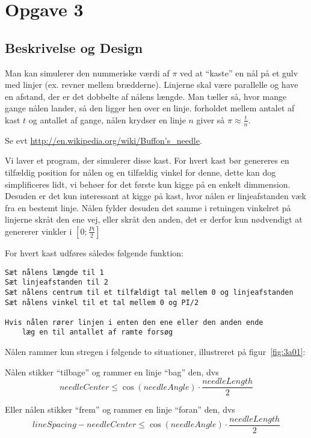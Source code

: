 \section{Opgave 3}
\subsection{Beskrivelse og Design}
	
	Man kan simulerer den nummeriske værdi af $\pi$ ved at ``kaste'' en nål på et gulv med linjer (ex. revner mellem brædderne).
	Linjerne skal være parallelle og have en afstand, der er det dobbelte af nålens længde.
	Man tæller så, hvor mange gange nålen lander, så den ligger hen over en linje. forholdet mellem antalet af kast $t$
	og antallet af gange, nålen krydser en linje $n$ giver så $\pi \approx \frac{t}{n}$.
	
	Se evt \url{http://en.wikipedia.org/wiki/Buffon's_needle}.
	
	Vi laver et program, der simulerer disse kast.
	For hvert kast bør genereres en tilfældig position for nålen og en tilfældig vinkel for denne,
	dette kan dog simplificeres lidt, vi behøer for det første kun kigge på en enkelt dimmension.
	Desuden er det kun interessant at kigge på kast, hvor nålen er linjeafstanden væk fra en bestemt linje.
	Nålen fylder desuden det samme i retningen vinkelret på linjerne skråt den ene vej, eller skråt den anden,
	det er derfor kun nødvendigt at genererer vinkler i $[0;\frac{Pi}{2}]$
	
	For hvert kast udføres således følgende funktion:
	
	\begin{lstlisting}[caption=Pseudokode for hvert kast]
Sæt nålens længde til 1
Sæt linjeafstanden til 2
Sæt nålens centrum til et tilfældigt tal mellem 0 og linjeafstanden
Sæt nålens vinkel til et tal mellem 0 og PI/2

Hvis nålen rører linjen i enten den ene eller den anden ende
	læg en til antallet af ramte forsøg
	\end{lstlisting}

	Nålen rammer kun stregen i følgende to situationer, illustreret på figur~\ref{fig:3a01}:
	
	Nålen stikker ``tilbage'' og rammer en linje ``bag'' den, dvs
	\begin{equation}
	needleCenter \leq \cos(needleAngle)\cdot \frac{needleLength}{2}
	\end{equation}
	
	Eller nålen stikker ``frem'' og rammer en linje ``foran'' den, dvs
	\begin{equation}
	lineSpacing - needleCenter \leq \cos(needleAngle)\cdot \frac{needleLength}{2}
	\end{equation}

